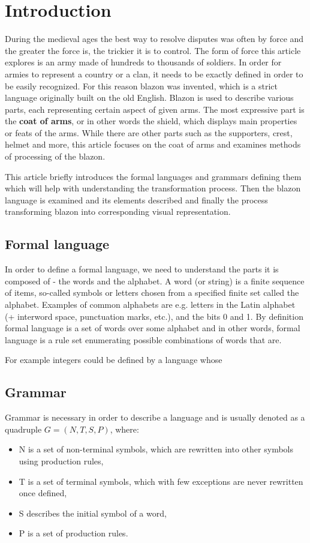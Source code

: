 \documentclass[12pt,a4paper]{article}
\let\oldsection\section
\renewcommand\section{\clearpage\oldsection}
\begin{document}
\section{Introduction}
During the medieval ages the best way to resolve disputes was often by force and the greater the force is, the trickier it is to control. The form of force this article explores is an army made of hundreds to thousands of soldiers. In order for armies to represent a country or a clan, it needs to be exactly defined in order to be easily recognized. For this reason blazon was invented, which is a strict language originally built on the old English.
Blazon is used to describe various parts, each representing certain aspect of given arms. The most expressive part is the \textbf{coat of arms}, or in other words the shield, which displays main properties or feats of the arms.
While there are other parts such as the supporters, crest, helmet and more, this article focuses on the coat of arms and examines methods of processing of the blazon.

This article briefly introduces the formal languages and grammars defining them which will help with understanding the transformation process. Then the blazon language is examined and its elements described and finally the process transforming blazon into corresponding visual representation.


\subsection{Formal language}
In order to define a formal language, we need to understand the parts it is composed of - the words and the alphabet.
A word (or string) is a finite sequence of items, so-called symbols or letters chosen from a specified finite set called the alphabet.
Examples of common alphabets are e.g. letters in the Latin alphabet (+ interword space, punctuation marks, etc.), and the bits 0 and 1.\cite{ruohonen2009formal}
By definition formal language is a set of words over some alphabet and in other words, formal language is a rule set enumerating possible combinations of words that are.

For example integers could be defined by a language whose 

\subsection{Grammar}
Grammar is necessary in order to describe a language and is usually denoted as a quadruple $G = (N, T, S, P)$, where:
\begin{itemize}	\setlength\itemsep{-0.5em}
\item N is a set of non-terminal symbols, which are rewritten into other symbols using production rules,
\item T is a set of terminal symbols, which with few exceptions are never rewritten once defined,
\item S describes the initial symbol of a word,
\item P is a set of production rules.
\end{itemize}
\end{document}
